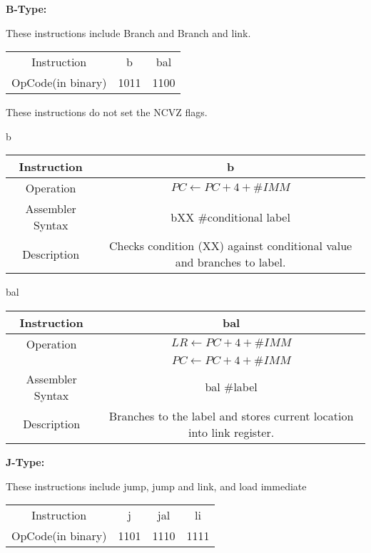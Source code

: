 \documentclass[]{article}
\begin{document}
\pagebreak

{\Large
	\textbf{
		B-Type:
	}
}

\noindent These instructions include Branch and Branch and link.

\begin{center}
	\begin{tabular}{|c|c|c|}\cline{1-3}
	Instruction & b & bal \\\cline{1-3}\hfill
	OpCode(in binary) & 1011 & 1100 \\\cline{1-3}
	\end{tabular}\vspace{1.5cm}
\end{center}

\noindent These instructions do not set the NCVZ flags.

b\\
\begin{tabular}{c|c}\hline
	Instruction & b\\\hline
	Operation & $PC \leftarrow PC + 4 + \#IMM$\\\hline
	Assembler Syntax & bXX \#conditional label\\\hline
	Description & Checks condition (XX) against conditional value and branches to label.\\\hline
\end{tabular}\vspace{1.5cm}

bal\\
\begin{tabular}{c|c}\hline
	Instruction & bal\\\hline
	Operation & $LR \leftarrow PC + 4 + \#IMM$\\&$PC \leftarrow PC + 4 + \#IMM$\\\hline
	Assembler Syntax & bal \#label\\\hline
	Description & Branches to the label and stores current location into link register.\\\hline
\end{tabular}\vspace{1.5cm}


\pagebreak

{\Large
	\textbf{
		J-Type:
	}
}

\noindent These instructions include jump, jump and link, and load immediate

\begin{center}
	\begin{tabular}{|c|c|c|c|}\cline{1-4}
	Instruction & j & jal & li \\\cline{1-4}\hfill
	OpCode(in binary) & 1101 & 1110 & 1111 \\\cline{1-4}
	\end{tabular}\vspace{1.5cm}
\end{center}
\end{document}
